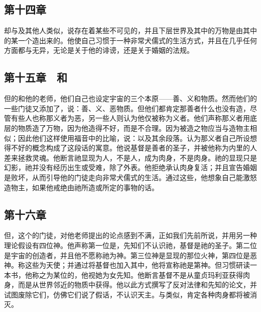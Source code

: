 
\subsection{第十四章　}

却与及其他人类似，说存在着某些不可见的，并且下层世界及其中的万物是由其中的某一个造出来的。他使自己习惯于一种非常犬儒式的生活方式，并且在几乎任何方面都与无异，无论是关于他的诽谤，还是关于婚姻的法规。\par


\subsection{第十五章　和}

但的和他的老师，他们自己也设定宇宙的三个本原——善、义和物质。然而他们的一些门徒又添加了，说：善、义、恶物质。但他们都肯定那善者什么也没有造，尽管有些人也称那义者为恶，另一些人则认为他仅被称为义者。他们声称那义者用底层的物质造了万物，因为他造得不好，而是不合理。因为被造之物应当与造物主相似；因此他们这样使用福音中的比喻，说：以及其余段落。认为那义者自己所设想得不好的概念构成了这段话的寓意。他说基督是善者的圣子，并被他称为内里的人差来拯救灵魂。他断言祂显现为人，不是人，成为肉身，不是肉身。祂的显现只是幻影，祂并没有经历出生或受难，除了外表。他拒绝承认肉身复活；并且宣告婚姻是败坏，从而引导他的门徒走向非常犬儒式的生活。通过这些，他想象自己能激怒造物主，如果他戒绝由祂所造或所定的事物的话。\par


\subsection{第十六章　}

但，这个的门徒，对他老师提出的论点感到不满，正如我们先前所说，并用另一种理论假设有四位神。他声称第一位是，先知们不认识祂，基督是祂的圣子。第二位是宇宙的创造者，并且他不愿称祂为神。第三位神是显现的那位火神，第四位是恶神。称这些为天使；并通过将基督也加入其中，他将宣称祂是第神。但习惯研读一本书，他称之为某位的，他视她为女先知。他断言基督不是从童贞玛利亚获得肉身，而是从世界邻近的物质中获得。他以此方式撰写了反对法律和先知的论文，并试图废除它们，仿佛它们说了假话，不认识天主。与类似，肯定各种肉身都将被消灭。\par

